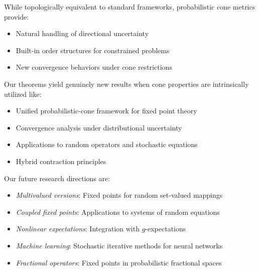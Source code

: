 \documentclass{amsart}
\theoremstyle{definition}
\theoremstyle{remark}
\numberwithin{equation}{section}
\begin{document}
While topologically equivalent to standard frameworks, probabilistic cone metrics provide:
\begin{itemize}
    \item Natural handling of directional uncertainty
    \item Built-in order structures for constrained problems
    \item New convergence behaviors under cone restrictions
\end{itemize}
Our theorems yield genuinely new results when cone properties are intrinsically utilized like:
\begin{itemize}
    \item Unified probabilistic-cone framework for fixed point theory
    \item Convergence analysis under distributional uncertainty
    \item Applications to random operators and stochastic equations
    \item Hybrid contraction principles
\end{itemize}
Our future research directions are:
\begin{itemize}
    \item \textit{Multivalued versions}: Fixed points for random set-valued mappings
    \item \textit{Coupled fixed points}: Applications to systems of random equations
    \item \textit{Nonlinear expectations}: Integration with $g$-expectations
    \item \textit{Machine learning}: Stochastic iterative methods for neural networks
    \item \textit{Fractional operators}: Fixed points in probabilistic fractional spaces
\end{itemize}
\end{document}
